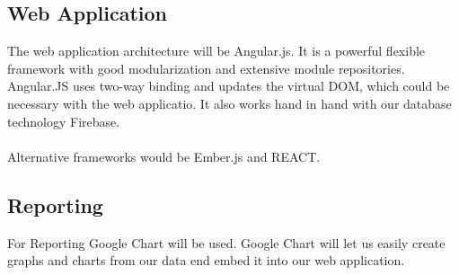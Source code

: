 \documentclass[paper=a4, fontsize=11pt]{scrartcl} %
\begin{document}
	\subsection{Web Application}
	The web application architecture will be Angular.js. It is a powerful flexible framework with good modularization and extensive module
	repositories. Angular.JS uses two-way binding and updates the virtual DOM, which could be necessary with the web applicatio. It also works
	hand in hand with our database technology Firebase.\\
	\\Alternative frameworks would be Ember.js and REACT.
	\subsection{Reporting}
	For Reporting Google Chart will be used. Google Chart will let us easily create graphs and charts from our data 
	end embed it into our web application.
\end{document}
